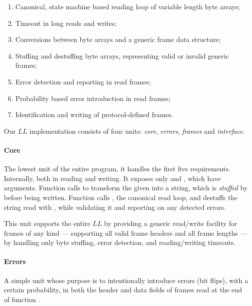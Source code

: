\documentclass[main.tex]{subfiles}
\begin{document}
\begin{enumerate}[label=(\alph*),noitemsep,rightmargin=3em]
	\item Canonical, state machine based reading loop of variable length byte arrays;
	\item Timeout in long reads and writes;
	\item Conversions between byte arrays and a generic frame data structure;
	\item Stuffing and destuffing byte arrays, representing valid or invalid generic frames;
	\item Error detection and reporting in read frames;
	\item Probability based error introduction in read frames;
	\item Identification and writing of protocol-defined frames.
\end{enumerate}

Our $LL$ implementation consists of four units: \emph{core}, \emph{errors}, \emph{frames} and \emph{interface}.

\paragraph{Core} The lowest unit of the entire program, it handles the first five requirements. Internally, both in reading and writing. It exposes only  and , which have  arguments. Function  calls  to transform the given  into a string, which is \textit{stuffed} by  before being written. Function  calls , the canonical read loop, and destuffs the string read with , while validating it and reporting on any detected errors.

This unit supports the entire $LL$ by providing a generic read/write facility for frames of any kind --- supporting all valid frame headers and all frame lengths --- by handling only byte stuffing, error detection, and reading/writing timeouts.

\paragraph{Errors} A simple unit whose purpose is to intentionally introduce errors (bit flips), with a certain probability, in both the header and data fields of frames read at the end of function .
\end{document}
